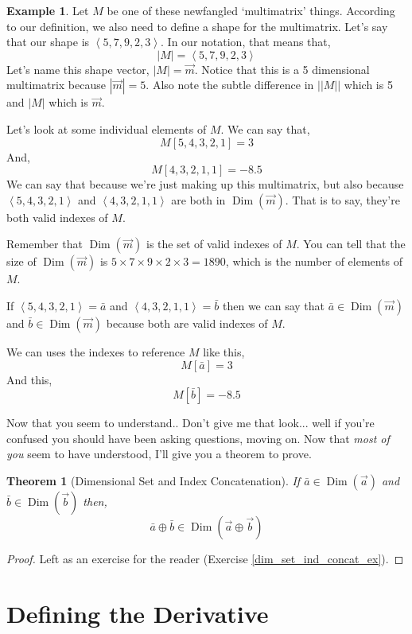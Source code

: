 \documentclass[12pt]{book}
\theoremstyle{plain}
\newtheorem{theorem}{Theorem}[chapter]
\theoremstyle{definition}
\newtheorem{example}{Example}[chapter]
\theoremstyle{ppart}
\theoremstyle{case}
\theoremstyle{solution}
\DeclareMathOperator{\Dim}{Dim}
\begin{document}
\begin{example}
Let $M$ be one of these newfangled `multimatrix' things. According to our
definition, we also need to define a shape for the multimatrix. Let's
say that our shape is $\left<5,7,9,2,3\right>$. In our notation, that
means that,
\[ |M| = \left<5,7,9,2,3\right> \]
Let's name this shape vector, $|M| = \vec{m}$. Notice that this is
a 5 dimensional multimatrix because $|\vec{m}| = 5$. Also note the
subtle difference in $||M||$ which is 5 and $|M|$ which is $\vec{m}$.

Let's look at some individual elements of $M$. We can say that,
\[ M[5,4,3,2,1] = 3 \]
And,
\[ M[4,3,2,1,1] = -8.5 \]
We can say that because we're just making up this multimatrix, but also
because $\left<5,4,3,2,1\right>$ and $\left<4,3,2,1,1\right>$
are both in $\Dim(\vec{m})$. That is to say, they're both valid
indexes of $M$.

Remember that $\Dim(\vec{m})$ is the set of valid indexes of $M$.
You can tell that the size of  $\Dim(\vec{m})$ is
$5 \times 7 \times 9 \times 2 \times 3 = 1890$, which is the number of
elements of $M$.

If $\left<5,4,3,2,1\right> = \bar{a}$ and $\left<4,3,2,1,1\right> = \bar{b}$
then we can say that $\bar{a} \in \Dim(\vec{m})$ and $\bar{b} \in \Dim(\vec{m})$
because both are valid indexes of $M$.

We can uses the indexes to reference $M$ like this,
\[ M[\bar{a}] = 3 \]
And this,
\[ M[\bar{b}] = -8.5 \]
\end{example}

Now that you seem to understand.. Don't give me that look... well if you're confused
you should have been asking questions, moving on. Now that \textit{most of you}
seem to have understood, I'll give you a theorem to prove.

\begin{theorem}[Dimensional Set and Index Concatenation]
\label{dim_set_ind_concat_thm}
If $\bar{a} \in \Dim(\vec{a})$ and $\bar{b} \in \Dim(\vec{b})$ then,
\[ \bar{a} \oplus \bar{b} \in \Dim(\vec{a} \oplus \vec{b}) \]
\end{theorem}
\begin{proof}
Left as an exercise for the reader (Exercise \ref{dim_set_ind_concat_ex}).
\end{proof}

\section{Defining the Derivative}
\end{document}
